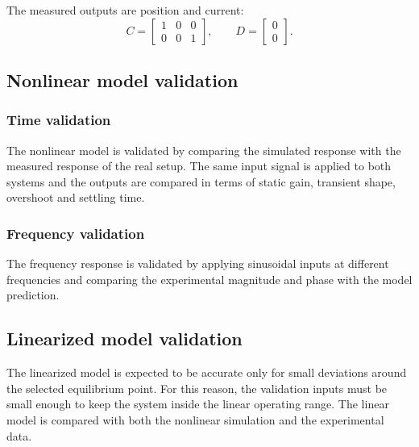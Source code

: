 The measured outputs are position and current:
\begin{equation}
    C =
    \begin{bmatrix}
        1 & 0 & 0 \\
        0 & 0 & 1
    \end{bmatrix},
    \qquad
    D =
    \begin{bmatrix}
        0 \\
        0
    \end{bmatrix}.
    \label{eq:output_matrix}
\end{equation}

\subsection{Nonlinear model validation}

\subsubsection{Time validation}

The nonlinear model is validated by comparing the simulated response with the measured response of the real setup. The same input signal is applied to both systems and the outputs are compared in terms of static gain, transient shape, overshoot and settling time.


\subsubsection{Frequency validation}

The frequency response is validated by applying sinusoidal inputs at different frequencies and comparing the experimental magnitude and phase with the model prediction.


\subsection{Linearized model validation}

The linearized model is expected to be accurate only for small deviations around the selected equilibrium point. For this reason, the validation inputs must be small enough to keep the system inside the linear operating range. The linear model is compared with both the nonlinear simulation and the experimental data.
